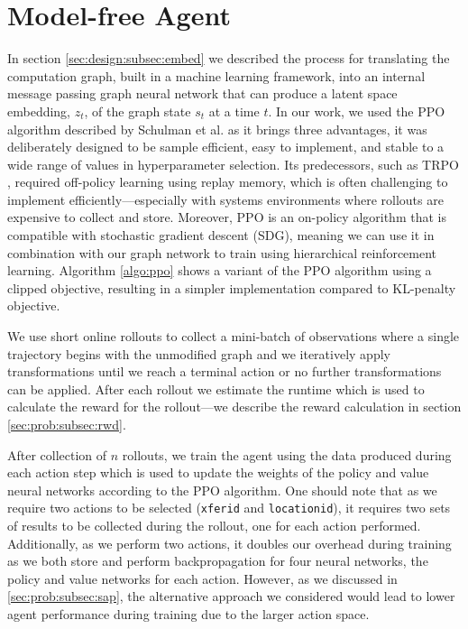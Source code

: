 \section{Model-free Agent}

In section \ref{sec:design:subsec:embed} we described the process for translating the computation graph, built in a machine learning framework, into an internal message passing graph neural network that can produce a latent space embedding, $z_t$, of the graph state $s_t$ at a time $t$. In our work, we used the PPO algorithm  described by Schulman et al. \cite{schulman2017proximal} as it brings three advantages, it was deliberately designed to be sample efficient, easy to implement, and stable to a wide range of values in hyperparameter selection. Its predecessors, such as TRPO \cite{schulman2017trust}, required off-policy learning using replay memory, which is often challenging to implement efficiently---especially with systems environments where rollouts are expensive to collect and store. Moreover, PPO is an on-policy algorithm that is compatible with stochastic gradient descent (SDG), meaning we can use it in combination with our graph network to train using hierarchical reinforcement learning. Algorithm \ref{algo:ppo} shows a variant of the PPO algorithm using a clipped objective, resulting in a simpler implementation compared to KL-penalty objective.




We use short online rollouts to collect a mini-batch of observations where a single trajectory begins with the unmodified graph and we iteratively apply transformations until we reach a terminal action or no further transformations can be applied. After each rollout we estimate the runtime which is used to calculate the reward for the rollout---we describe the reward calculation in section \ref{sec:prob:subsec:rwd}.

After collection of $n$ rollouts, we train the agent using the data produced during each action step which is used to update the weights of the policy and value neural networks according to the PPO algorithm. One should note that as we require two actions to be selected (\texttt{xfer\textunderscore id} and \texttt{location\textunderscore id}), it requires two sets of results to be collected during the rollout, one for each action performed. Additionally, as we perform two actions, it doubles our overhead during training as we both store and perform backpropagation for four neural networks, the policy and value networks for each action. However, as we discussed in \ref{sec:prob:subsec:sap}, the alternative approach we considered would lead to lower agent performance during training due to the larger action space.